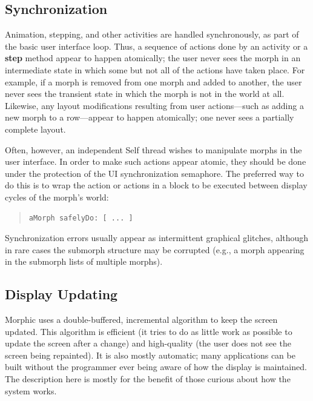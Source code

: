 \documentclass[letterpaper,10pt,english]{sphinxmanual}
\begin{document}
\subsection{Synchronization}
\label{morphic:synchronization}
Animation, stepping, and other activities are handled synchronously, as part of the basic user interface loop. Thus, a sequence of actions done by an activity or a \textbf{step} method appear to happen atomically; the user never sees the morph in an intermediate state in which some but not all of the actions have taken place. For example, if a morph is removed from one morph and added to another, the user never sees the transient state in which the morph is not in the world at all. Likewise, any layout modifications resulting from user actions—such as adding a new morph to a row—appear to happen atomically; one never sees a partially complete layout.

Often, however, an independent Self thread wishes to manipulate morphs in the user interface. In order to make such actions appear atomic, they should be done under the protection of the UI synchronization semaphore. The preferred way to do this is to wrap the action or actions in a block to be executed between display cycles of the morph's world:
\begin{quote}

\begin{Verbatim}[commandchars=\\\{\}]
aMorph safelyDo: [ ... ]
\end{Verbatim}
\end{quote}

Synchronization errors usually appear as intermittent graphical glitches, although in rare cases the submorph structure may be corrupted (e.g., a morph appearing in the submorph lists of multiple morphs).


\subsection{Display Updating}
\label{morphic:display-updating}
Morphic uses a double-buffered, incremental algorithm to keep the screen updated. This algorithm is efficient (it tries to do as little work as possible to update the screen after a change) and high-quality (the user does not see the screen being repainted). It is also mostly automatic; many applications can be built without the programmer ever being aware of how the display is maintained. The description here is mostly for the benefit of those curious about how the system works.
\end{document}
